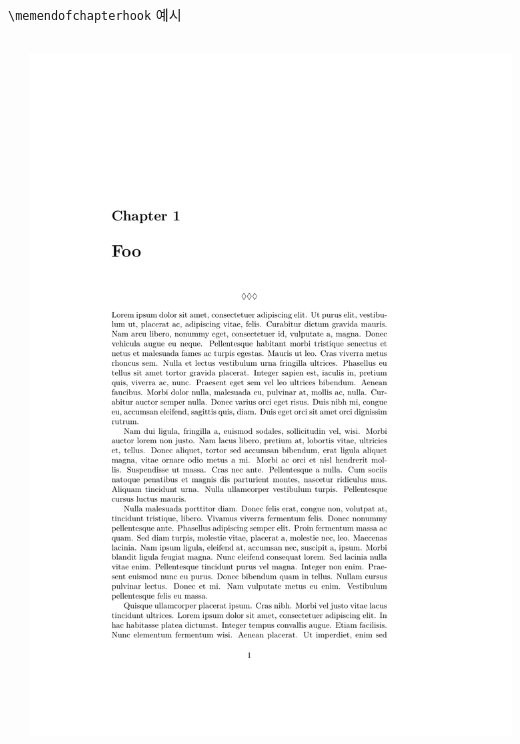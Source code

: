 \documentclass{beamer}
\def\tbs{\textbackslash}
\begin{document}
\begin{frame}[fragile]{\texttt{\tbs memendofchapterhook} 예시}
  \begin{columns}
    \begin{column}{0.6\textwidth}
      \begin{latexcode}
        \renewcommand*{\clearforchapter}{}
        \renewcommand{\memendofchapterhook}{%
          \begin{center}
            $\lozenge\lozenge\lozenge$
          \end{center}}
      \end{latexcode}
    \end{column}

    \begin{column}{0.4\textwidth}
      \includegraphics[frame,page=1,width=\linewidth]{examples/memendofchapterhook}
    \end{column}
  \end{columns}
\end{frame}
\end{document}
